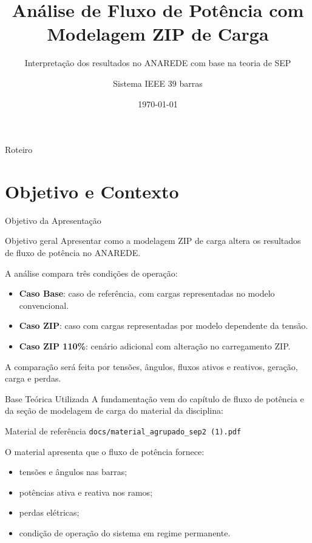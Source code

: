 \documentclass[aspectratio=169,11pt]{beamer}
\title[Modelo ZIP no ANAREDE]{Análise de Fluxo de Potência com Modelagem ZIP de Carga}
\subtitle{Interpretação dos resultados no ANAREDE com base na teoria de SEP}
\author{Sistema IEEE 39 barras}
\institute{Sistemas Elétricos de Potência}
\date{\today}
\newcommand{\casobase}{Caso Base}
\newcommand{\casozip}{Caso ZIP}
\newcommand{\casozipcento}{Caso ZIP 110\%}
\begin{document}
\begin{frame}
  \titlepage
\end{frame}

\begin{frame}{Roteiro}
  \tableofcontents
\end{frame}

\section{Objetivo e Contexto}

\begin{frame}{Objetivo da Apresentação}
  \begin{block}{Objetivo geral}
    Apresentar como a modelagem ZIP de carga altera os resultados de fluxo de potência no ANAREDE.
  \end{block}

  \vspace{0.3cm}
  A análise compara três condições de operação:

  \begin{itemize}
    \item \textbf{\casobase}: caso de referência, com cargas representadas no modelo convencional.
    \item \textbf{\casozip}: caso com cargas representadas por modelo dependente da tensão.
    \item \textbf{\casozipcento}: cenário adicional com alteração no carregamento ZIP.
  \end{itemize}

  \vspace{0.2cm}
  A comparação será feita por tensões, ângulos, fluxos ativos e reativos, geração, carga e perdas.
\end{frame}

\begin{frame}{Base Teórica Utilizada}
  A fundamentação vem do capítulo de fluxo de potência e da seção de modelagem de carga do material da disciplina:

  \begin{block}{Material de referência}
    \texttt{docs/material\_agrupado\_sep2 (1).pdf}
  \end{block}

  O material apresenta que o fluxo de potência fornece:

  \begin{itemize}
    \item tensões e ângulos nas barras;
    \item potências ativa e reativa nos ramos;
    \item perdas elétricas;
    \item condição de operação do sistema em regime permanente.
  \end{itemize}
\end{frame}
\end{document}
